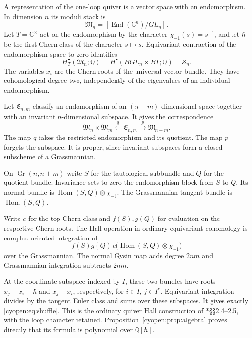 A representation of the one-loop quiver is a vector space with
an endomorphism. In dimension $n$ its moduli stack is
\[
 \mathfrak M_n=[\operatorname{End}(\mathbb C^n)/GL_n].
\]
Let $T=\mathbb C^\times$ act on the endomorphism by the character
$\chi_{-1}(s)=s^{-1}$, and let $\hbar$ be the first Chern class
of the character $s\mapsto s$. Equivariant contraction of the
endomorphism space to zero identifies
\[
 H^\bullet_T(\mathfrak M_n;\mathbb Q)
 =H^\bullet(BGL_n\times BT;\mathbb Q)=\mathcal S_n.
\]
The variables $x_i$ are the Chern roots of the universal vector
bundle. They have cohomological degree two, independently of the
eigenvalues of an individual endomorphism.

Let $\mathfrak E_{n,m}$ classify an endomorphism of an
$(n+m)$-dimensional space together with an invariant
$n$-dimensional subspace. It gives the correspondence
\begin{equation}\label{cyopen:eq:extension-correspondence}
 \mathfrak M_n\times\mathfrak M_m
 \xleftarrow{\ q\ }\mathfrak E_{n,m}
 \xrightarrow{\ p\ }\mathfrak M_{n+m}.
\end{equation}
The map $q$ takes the restricted endomorphism and its quotient.
The map $p$ forgets the subspace. It is proper, since invariant
subspaces form a closed subscheme of a Grassmannian.

On $\operatorname{Gr}(n,n+m)$ write $S$ for the tautological
subbundle and $Q$ for the quotient bundle. Invariance sets to
zero the endomorphism block from $S$ to $Q$.
Its normal bundle is
$\operatorname{Hom}(S,Q)\otimes\chi_{-1}$.
The Grassmannian tangent bundle is $\operatorname{Hom}(S,Q)$.

Write $e$ for the top Chern class and $f(S),g(Q)$ for evaluation
on the respective Chern roots.
The Hall operation in ordinary equivariant cohomology is
complex-oriented integration of
\begin{equation}\label{cyopen:eq:euler-integration}
 f(S)g(Q)\,
 e\bigl(\operatorname{Hom}(S,Q)\otimes\chi_{-1}\bigr)
\end{equation}
over the Grassmannian.
The normal Gysin map adds degree $2nm$ and Grassmannian
integration subtracts $2nm$.

At the coordinate subspace indexed by $I$, these two bundles have
roots $x_j-x_i-\hbar$ and $x_j-x_i$, respectively, for
$i\in I$, $j\in I^c$. Equivariant integration divides by the
tangent Euler class and sums over these subspaces.
It gives exactly \eqref{cyopen:eq:shuffle}.
This is the ordinary quiver Hall construction of
\cite{cyopen:KS}*{\S\S2.4--2.5}, with the loop character retained.
Proposition~\ref{cyopen:prop:algebra} proves directly that its
formula is polynomial over $\mathbb Q[\hbar]$.

